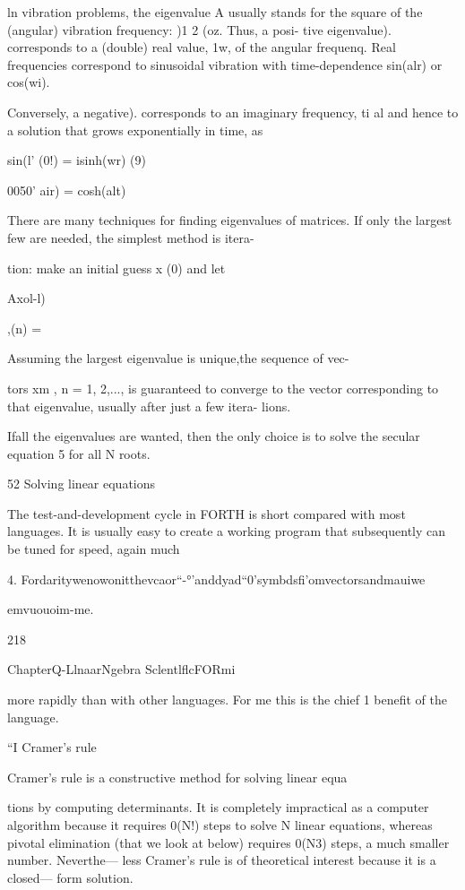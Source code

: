 {ln vibration problems, the eigenvalue A usually stands for the
square of the (angular) vibration frequency: )1 2 (oz. Thus, a posi-
tive eigenvalue). corresponds to a (double) real value, 1w, of the
angular frequenq. Real frequencies correspond to sinusoidal
vibration with time-dependence sin(alr) or cos(wi).

Conversely, a negative). corresponds to an imaginary frequency,
ti al and hence to a solution that grows exponentially in time, as

sin(l' (0!) = isinh(wr)
(9)

0050' air) = cosh(alt)

There are many techniques for ﬁnding eigenvalues of matrices.
If only the largest few are needed, the simplest method is itera-

tion: make an initial guess x (0) and let

Axol-l)

,(n) =

Assuming the largest eigenvalue is unique,the sequence of vec-

tors xm , n = 1, 2,..., is guaranteed to converge to the vector
corresponding to that eigenvalue, usually after just a few itera-
lions.

Ifall the eigenvalues are wanted, then the only choice is to solve
the secular equation 5 for all N roots.

52 Solving linear equations

The test-and-development cycle in FORTH is short compared
with most languages. It is usually easy to create a working
program that subsequently can be tuned for speed, again much

 

4. Fordaritywenowonitthevcaor“-°'anddyad“0'symbdsﬁ'omvectorsandmauiwe

emvuouoim-me.

218

ChapterQ-LlnaarNgebra SclentlﬂcFORmi

more rapidly than with other languages. For me this is the chief 1
beneﬁt of the language.

“I Cramer's rule

Cramer’s rule is a constructive method for solving linear equa

tions by computing determinants. It is completely impractical
as a computer algorithm because it requires 0(N!) steps to solve
N linear equations, whereas pivotal elimination (that we look at
below) requires 0(N3) steps, a much smaller number. Neverthe—
less Cramer’s rule is of theoretical interest because it is a closed—
form solution.

}
